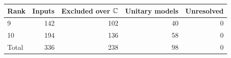 \begin{center}
\begin{tabular}{lrrrr}
\toprule Rank & Inputs & Excluded over $\mathbb C$ & Unitary models & Unresolved \\
\midrule
9 & 142 & 102 & 40 & 0 \\
10 & 194 & 136 & 58 & 0 \\
Total & 336 & 238 & 98 & 0 \\
\bottomrule
\end{tabular}
\end{center}
